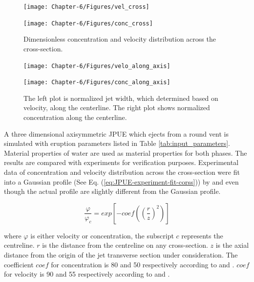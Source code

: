 \begin{figure}
    \centering
    \begin{minipage}{.49\textwidth}
        \centering
        \texttt{[image: Chapter-6/Figures/vel\_cross]}
    \end{minipage}%
    \begin{minipage}{.49 \textwidth}
        \centering
        \texttt{[image: Chapter-6/Figures/conc\_cross]}
    \end{minipage}%
    \caption{Dimensionless concentration and velocity distribution across the cross-section.}
    \label{fig:JPUE_cross-section}
\end{figure}

\begin{figure}
    \centering
    \begin{minipage}{.49\textwidth}
        \centering
        \texttt{[image: Chapter-6/Figures/velo\_along\_axis]}
    \end{minipage}%
    \begin{minipage}{.49 \textwidth}
        \centering
        \texttt{[image: Chapter-6/Figures/conc\_along\_axis]}
    \end{minipage}%
    \caption{The left plot is normalized jet width, which determined based on velocity, along the centerline. The right plot shows normalized concentration along the centerline.}
    \label{fig:JPUE_along-axis}
\end{figure}

A three dimensional axisymmetric JPUE which ejects from a round vent is simulated with eruption parameters listed in Table \ref{tab:input_parameters}. Material properties of water are used as material properties for both phases. The results are compared with experiments \citep {george1977turbulence, papanicolaou1988investigations} for verification purposes. Experimental data of concentration and velocity distribution across the cross-section were fit into a Gaussian profile (See Eq. (\ref{eq:JPUE-experiment-fit-corss})) by \citet{papanicolaou1988investigations} and  \citet{ george1977turbulence} even though the actual profile are slightly different from the Gaussian profile.

\begin{equation}
\dfrac{\varphi}{\varphi_c}=exp \left[-coef\left( \left(\dfrac{r}{z}\right)^2\right)\right]
\label{eq:JPUE-experiment-fit-corss}
\end{equation}

where $\varphi$ is either velocity or concentration, the subscript $c$ represents the centreline. $r$ is the distance from the centreline on any cross-section. $z$ is the axial distance from the origin of the jet transverse section under consideration. 
The coefficient $coef$ for concentration is 80 and 50 respectively according to \citet{george1977turbulence} and \citet{papanicolaou1988investigations}.
$coef$ for velocity is 90 and 55 respectively according to \citet{george1977turbulence} and \citet{papanicolaou1988investigations}. 

